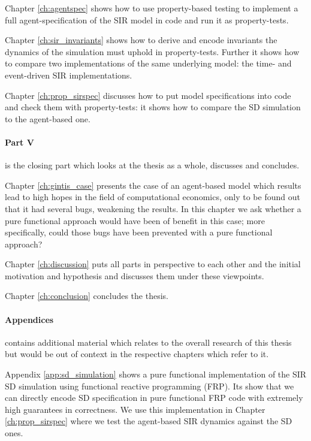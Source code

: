 Chapter \ref{ch:agentspec} shows how to use property-based testing to implement a full agent-specification of the SIR model in code and run it as property-tests.

\medskip

Chapter \ref{ch:sir_invariants} shows how to derive and encode invariants the dynamics of the simulation must uphold in property-tests. Further it shows how to compare two implementations of the same underlying model: the time- and event-driven SIR implementations.

\medskip

Chapter \ref{ch:prop_sirspec} discusses how to put model specifications into code and check them with property-tests: it shows how to compare the SD simulation to the agent-based one.

\medskip

\paragraph{Part V} is the closing part which looks at the thesis as a whole, discusses and concludes.
\medskip

Chapter \ref{ch:gintis_case} presents the case of an agent-based model which results lead to high hopes in the field of computational economics, only to be found out that it had several bugs, weakening the results. In this chapter we ask whether a pure functional approach would have been of benefit in this case; more specifically, could those bugs have been prevented with a pure functional approach?

\medskip

Chapter \ref{ch:discussion} puts all parts in perspective to each other and the initial motivation and hypothesis and discusses them under these viewpoints.

\medskip

Chapter \ref{ch:conclusion} concludes the thesis.

\paragraph{Appendices} contains additional material which relates to the overall research of this thesis but would be out of context in the respective chapters which refer to it.
\medskip

Appendix \ref{app:sd_simulation} shows a pure functional implementation of the SIR SD simulation using functional reactive programming (FRP). Its show that we can directly encode SD specification in pure functional FRP code with extremely high guarantees in correctness. We use this implementation in Chapter \ref{ch:prop_sirspec} where we test the agent-based SIR dynamics against the SD ones.

